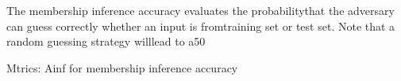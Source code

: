 The membership inference accuracy evaluates the probabilitythat the adversary can guess correctly whether an input is fromtraining set or test set. Note that a random guessing strategy willlead to a50%



Mtrics: Ainf for membership inference accuracy
